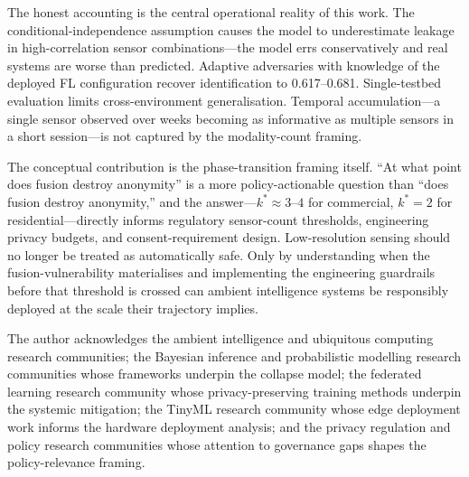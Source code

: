\documentclass[sigconf,nonacm]{acmart}
\begin{document}
The honest accounting is the central operational reality of
this work. The conditional-independence assumption causes the
model to underestimate leakage in high-correlation sensor
combinations---the model errs conservatively and real systems
are worse than predicted. Adaptive adversaries with knowledge
of the deployed FL configuration recover identification to
0.617--0.681. Single-testbed evaluation limits
cross-environment generalisation. Temporal accumulation---a
single sensor observed over weeks becoming as informative as
multiple sensors in a short session---is not captured by the
modality-count framing.

The conceptual contribution is the phase-transition framing
itself. ``At what point does fusion destroy anonymity'' is a more
policy-actionable question than ``does fusion destroy anonymity,''
and the answer---$k^* \approx 3$--$4$ for commercial,
$k^* = 2$ for residential---directly informs regulatory
sensor-count thresholds, engineering privacy budgets, and
consent-requirement design. Low-resolution sensing should no
longer be treated as automatically safe. Only by understanding
when the fusion-vulnerability materialises and implementing the
engineering guardrails before that threshold is crossed can
ambient intelligence systems be responsibly deployed at the
scale their trajectory implies.

\begin{acks}
The author acknowledges the ambient intelligence and
ubiquitous computing research communities; the Bayesian
inference and probabilistic modelling research communities
whose frameworks underpin the collapse model; the federated
learning research community whose privacy-preserving training
methods underpin the systemic mitigation; the TinyML research
community whose edge deployment work informs the hardware
deployment analysis; and the privacy regulation and policy
research communities whose attention to governance gaps shapes
the policy-relevance framing.
\end{acks}
\end{document}
